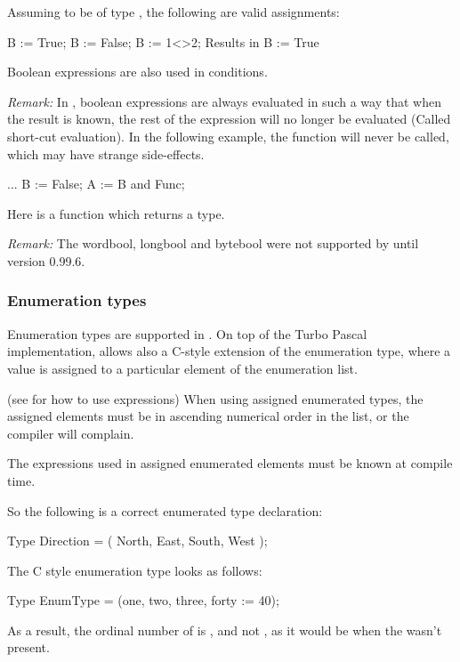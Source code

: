 \documentclass{report}
\begin{document}
Assuming  to be of type , the following are valid
assignments:
\begin{listing}
 B := True;
 B := False;
 B := 1<>2;  { Results in B := True }
\end{listing}
Boolean expressions are also used in conditions.

{\em Remark:} In \fpc, boolean expressions are always evaluated in such a
way that when the result is known, the rest of the expression will no longer
be evaluated (Called short-cut evaluation). In the following example, the function  will never
be called, which may have strange side-effects.
\begin{listing}
 ...
 B := False;
 A := B and Func;
\end{listing}
Here  is a function which returns a  type.

{\em Remark:} The wordbool, longbool and bytebool were not supported
by \fpc until version 0.99.6.

\subsubsection{Enumeration types}

Enumeration types are supported in \fpc. On top of the Turbo Pascal
implementation, \fpc allows also a C-style extension of the
enumeration type, where a value is assigned to a particular element of
the enumeration list.



(see  for how to use expressions)
When using assigned enumerated types, the assigned elements must be in
ascending numerical order in the list, or the compiler will complain.

The expressions used in assigned enumerated elements must be known at
compile time.

So the following is a correct enumerated type declaration:
\begin{listing}
Type
  Direction = ( North, East, South, West );
\end{listing}

The C style enumeration type looks as follows:
\begin{listing}
Type
  EnumType = (one, two, three, forty := 40);
\end{listing}
As a result, the ordinal number of  is , and not ,
as it would be when the  wasn't present.
\end{document}
